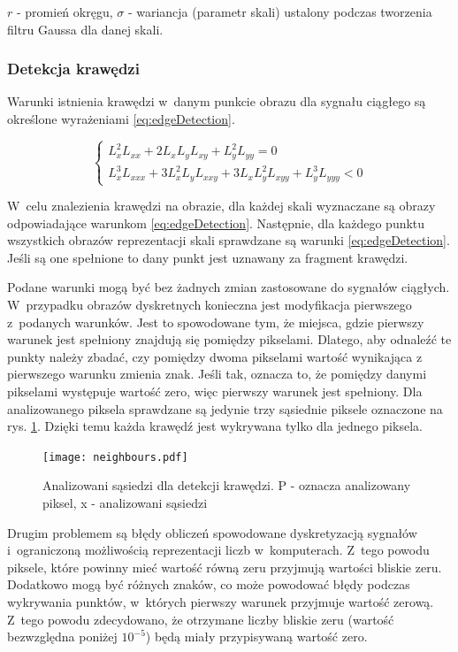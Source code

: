 $ r $ - promień okręgu,
$ \sigma $ - wariancja (parametr skali) ustalony podczas tworzenia filtru Gaussa dla danej skali.

\subsubsection{Detekcja krawędzi}
\label{subsubsec:detekcjaKrawedzi}

Warunki istnienia krawędzi w~danym punkcie obrazu dla sygnału ciągłego są określone wyrażeniami \eqref{eq:edgeDetection}.

\begin{equation}
\label{eq:edgeDetection}
\left\{ \begin{array}{rl}
L_x^2 L_{xx} + 2L_xL_yL_{xy} + L_y^2L_{yy} = 0 \\
L_x^3L_{xxx} + 3L_x^2L_yL_{xxy} + 3L_xL_y^2L_{xyy} + L_y^3L_{yyy} < 0
\end{array} \right.
\end{equation}

W~celu znalezienia krawędzi na obrazie, dla każdej skali wyznaczane są obrazy odpowiadające warunkom \eqref{eq:edgeDetection}. Następnie, dla każdego punktu wszystkich obrazów reprezentacji skali sprawdzane są warunki \eqref{eq:edgeDetection}. Jeśli są one spełnione to dany punkt jest uznawany za fragment krawędzi.

Podane warunki mogą być bez żadnych zmian zastosowane do sygnałów ciągłych. W~przypadku obrazów dyskretnych konieczna jest modyfikacja pierwszego z~podanych warunków. Jest to spowodowane tym, że miejsca, gdzie pierwszy warunek jest spełniony znajdują się pomiędzy pikselami. Dlatego, aby odnaleźć te punkty należy zbadać, czy pomiędzy dwoma pikselami wartość wynikająca z pierwszego warunku zmienia znak. Jeśli tak, oznacza to, że pomiędzy danymi pikselami występuje wartość zero, więc pierwszy warunek jest spełniony. Dla analizowanego piksela sprawdzane są jedynie trzy sąsiednie piksele oznaczone na rys. \ref{fig:comparePixels}. Dzięki temu każda krawędź jest wykrywana tylko dla jednego piksela.

\begin{figure}
\begin{center}
\texttt{[image: neighbours.pdf]}
\end{center}
\caption{Analizowani sąsiedzi dla detekcji krawędzi. P - oznacza analizowany piksel, x - analizowani sąsiedzi}
\label{fig:comparePixels}
\end{figure}

Drugim problemem są błędy obliczeń spowodowane dyskretyzacją sygnałów i~ograniczoną możliwością reprezentacji liczb w~komputerach. Z~tego powodu piksele, które powinny mieć wartość równą zeru przyjmują wartości bliskie zeru. Dodatkowo mogą być różnych znaków, co może powodować błędy podczas wykrywania punktów, w~których pierwszy warunek przyjmuje wartość zerową. Z~tego powodu zdecydowano, że otrzymane liczby bliskie zeru (wartość bezwzględna poniżej $ 10^{-5} $) będą miały przypisywaną wartość zero.


